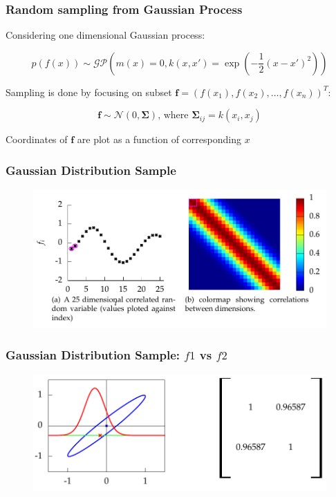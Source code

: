\documentclass[10pt]{beamer}
\newcommand{\boldf}{\mathbf{f}}
\newcommand{\gp}{\mathcal{GP}}
\newcommand{\gaussN}{\mathcal{N}}
\newcommand{\bSig}{\boldsymbol{\Sigma}}
\begin{document}
  \begin{frame}
    \frametitle{Random sampling from Gaussian Process}
    Considering one dimensional Gaussian process:

    \begin{equation*}
      p(f(x)) \sim \gp \left( m(x) = 0, k(x,x') = \exp \left( - \frac{1}{2} (x - x')^2 \right) \right)
    \end{equation*}

    Sampling is done by focusing on subset $\boldf = (f(x_1), f(x_2),\dots,f(x_n))^T$:

    \begin{equation*}
      \boldf \sim \gaussN(0,\bSig) \text{, where } \bSig_{ij} = k(x_i,x_j)
    \end{equation*}

    Coordinates of $\boldf$ are plot as a function of corresponding $x$
  \end{frame}

  \begin{frame}
    \frametitle{Gaussian Distribution Sample}

    \begin{figure}
      \centering
      \includegraphics[width=\textwidth]{samplePath.png}
    \end{figure}
  \end{frame}

  \begin{frame}[noframenumbering]
    \frametitle{Gaussian Distribution Sample: $f1$ vs $f2$}

    \begin{figure}
      \centering
      \includegraphics[width=\textwidth]{covariance1.png}
    \end{figure}
  \end{frame}
\end{document}
